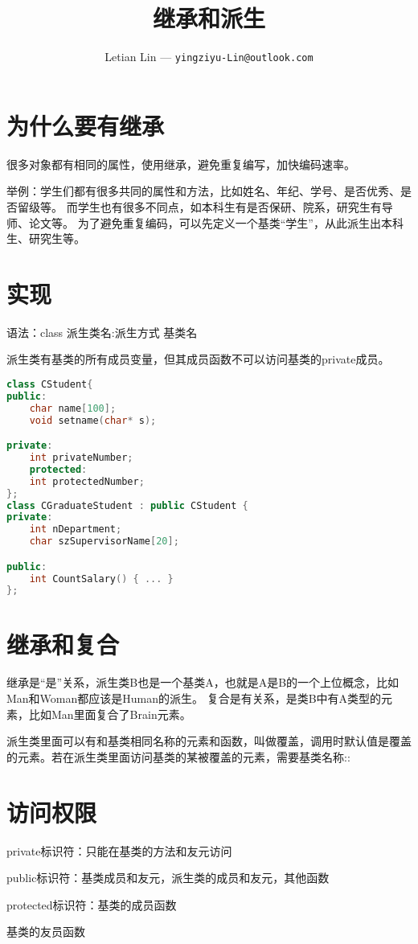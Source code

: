 \documentclass[UTF8]{ctexart}
\title{
	继承和派生
}
\author{
	Letian Lin --- \texttt{yingziyu-Lin@outlook.com}
}
\begin{document}
\maketitle
\section{为什么要有继承}
很多对象都有相同的属性，使用继承，避免重复编写，加快编码速率。

举例：学生们都有很多共同的属性和方法，比如姓名、年纪、学号、是否优秀、是否留级等。
而学生也有很多不同点，如本科生有是否保研、院系，研究生有导师、论文等。
为了避免重复编码，可以先定义一个基类“学生”，从此派生出本科生、研究生等。

\section{实现}
语法：class 派生类名:派生方式 基类名

派生类有基类的所有成员变量，但其成员函数不可以访问基类的private成员。

\begin{lstlisting}[language=C++]
class CStudent{
public:
	char name[100];
	void setname(char* s);

private:
	int privateNumber;
	protected:
	int protectedNumber;
};
class CGraduateStudent : public CStudent {
private:
	int nDepartment;
	char szSupervisorName[20];

public:
	int CountSalary() { ... }
};
\end{lstlisting}
\section{继承和复合}
继承是“是”关系，派生类B也是一个基类A，也就是A是B的一个上位概念，比如Man和Woman都应该是Human的派生。
复合是有关系，是类B中有A类型的元素，比如Man里面复合了Brain元素。

派生类里面可以有和基类相同名称的元素和函数，叫做覆盖，调用时默认值是覆盖的元素。若在派生类里面访问基类的某被覆盖的元素，需要基类名称::

\section{访问权限}
private标识符：只能在基类的方法和友元访问

public标识符：基类成员和友元，派生类的成员和友元，其他函数

protected标识符：基类的成员函数

基类的友员函数
\end{document}

